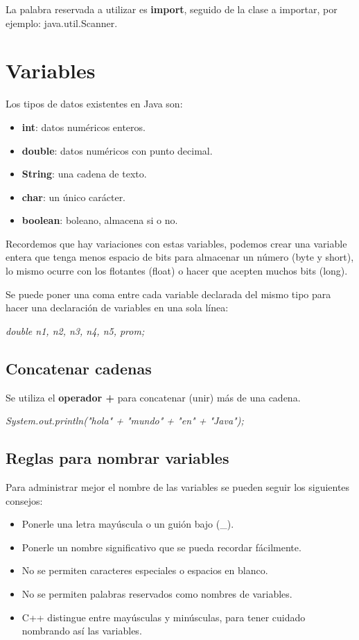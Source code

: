 La palabra reservada a utilizar es \textbf{import}, seguido de la clase a importar, por ejemplo: java.util.Scanner.



\section{Variables}
\hspace{0.55cm}Los tipos de datos existentes en Java son:
\begin{itemize}
    \item \textbf{int}: datos numéricos enteros.
    \item \textbf{double}: datos numéricos con punto decimal.
    \item \textbf{String}: una cadena de texto.
    \item \textbf{char}: un único carácter.
    \item \textbf{boolean}: boleano, almacena si o no.
\end{itemize}

Recordemos que hay variaciones con estas variables, podemos crear una variable entera que tenga menos espacio de bits para almacenar un número (byte y short), lo mismo ocurre con los flotantes (float) o hacer que acepten muchos bits (long).

Se puede poner una coma entre cada variable declarada del mismo tipo para hacer una declaración de variables en una sola línea:
\begin{center}
    \textit{double n1, n2, n3, n4, n5, prom;}
\end{center}


\subsection{Concatenar cadenas}
\hspace{0.55cm}Se utiliza el \textbf{operador +} para concatenar (unir) más de una cadena.
\begin{center}
    \textit{System.out.println("hola" + "mundo" + "en" + "Java");}
\end{center}


\subsection{Reglas para nombrar variables}
\hspace{0.55cm}Para administrar mejor el nombre de las variables se pueden seguir los siguientes consejos:
\begin{itemize}
    \item Ponerle una letra mayúscula o un guión bajo (\_).
    \item Ponerle un nombre significativo que se pueda recordar fácilmente.
    \item No se permiten caracteres especiales o espacios en blanco.
    \item No se permiten palabras reservados como nombres de variables.
    \item C++ distingue entre mayúsculas y minúsculas, para tener cuidado nombrando así las variables.
\end{itemize}



